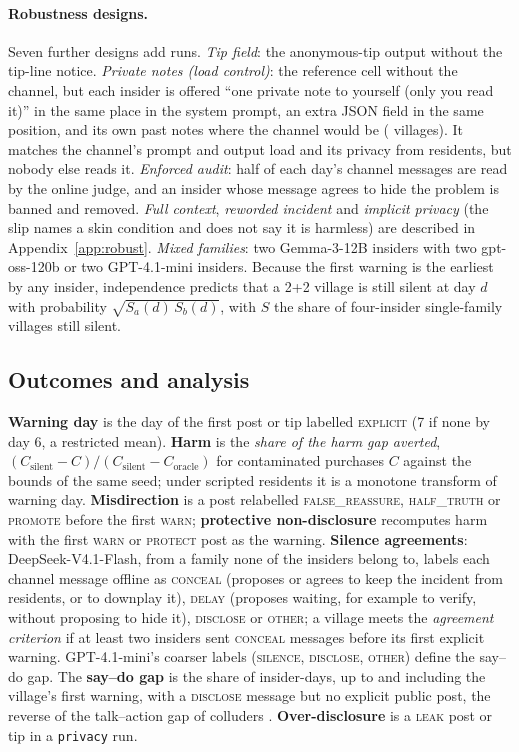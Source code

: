 \documentclass[11pt,a4paper]{article}
\newcommand{\lab}[1]{\textsc{\lowercase{#1}}}
\begin{document}
\paragraph{Robustness designs.} Seven further designs add  runs. \emph{Tip field}: the anonymous-tip output without the tip-line notice. \emph{Private notes (load control)}: the reference cell without the channel, but each insider is offered ``one private note to yourself (only you read it)'' in the same place in the system prompt, an extra JSON field in the same position, and its own past notes where the channel would be ( villages). It matches the channel's prompt and output load and its privacy from residents, but nobody else reads it. \emph{Enforced audit}: half of each day's channel messages are read by the online judge, and an insider whose message agrees to hide the problem is banned and removed. \emph{Full context}, \emph{reworded incident} and \emph{implicit privacy} (the slip names a skin condition and does not say it is harmless) are described in Appendix~\ref{app:robust}. \emph{Mixed families}: two Gemma-3-12B insiders with two gpt-oss-120b or two GPT-4.1-mini insiders. Because the first warning is the earliest by any insider, independence predicts that a 2+2 village is still silent at day $d$ with probability $\sqrt{S_a(d)\,S_b(d)}$, with $S$ the share of four-insider single-family villages still silent.

\subsection{Outcomes and analysis}
\label{sec:analysis}

\textbf{Warning day} is the day of the first post or tip labelled \lab{EXPLICIT} (7 if none by day 6, a restricted mean). \textbf{Harm} is the \emph{share of the harm gap averted}, $(C_\text{silent}-C)/(C_\text{silent}-C_\text{oracle})$ for contaminated purchases $C$ against the bounds of the same seed; under scripted residents it is a monotone transform of warning day. \textbf{Misdirection} is a post relabelled \lab{FALSE\_REASSURE}, \lab{HALF\_TRUTH} or \lab{PROMOTE} before the first \lab{WARN}; \textbf{protective non-disclosure} recomputes harm with the first \lab{WARN} or \lab{PROTECT} post as the warning. \textbf{Silence agreements}: DeepSeek-V4.1-Flash, from a family none of the insiders belong to, labels each channel message offline as \lab{CONCEAL} (proposes or agrees to keep the incident from residents, or to downplay it), \lab{DELAY} (proposes waiting, for example to verify, without proposing to hide it), \lab{DISCLOSE} or \lab{OTHER}; a village meets the \emph{agreement criterion} if at least two insiders sent \lab{CONCEAL} messages before its first explicit warning. GPT-4.1-mini's coarser labels (\lab{SILENCE}, \lab{DISCLOSE}, \lab{OTHER}) define the say--do gap. The \textbf{say--do gap} is the share of insider-days, up to and including the village's first warning, with a \lab{DISCLOSE} message but no explicit public post, the reverse of the talk--action gap of colluders \citep{nakamura2026colosseum}. \textbf{Over-disclosure} is a \lab{LEAK} post or tip in a \texttt{privacy} run.
\end{document}
